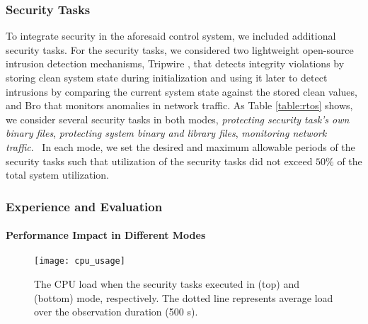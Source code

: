\documentclass[../rt_server_main.tex]{subfiles}
\begin{document}

%

\subsubsection{Security Tasks}
\label{subsubsec:sec_task}

To integrate security in the aforesaid control system, we included additional security tasks. For the security tasks, we considered two lightweight open-source intrusion detection mechanisms, \ci Tripwire \cite{tripwire}, that detects integrity violations by storing clean system state during initialization and using it later to detect intrusions by comparing the current system state against the stored clean values,  and \cii Bro \cite{bro} that monitors anomalies in network traffic. As Table \ref{table:rtos} shows, %
we consider several security tasks in both modes, \eg  \textit{protecting security task's own binary files}, \textit{protecting system binary and library files}, \textit{monitoring network traffic}.~%
In each mode, we set the desired and maximum allowable periods of the security tasks such that utilization of the security tasks did not exceed $50\%$ of the total system utilization. %




\subsubsection{Experience and Evaluation}



\paragraph{Performance Impact in Different Modes}



 \begin{figure}[!t]
\centering
\texttt{[image: cpu\_usage]}
\caption{The CPU load when the security tasks executed in \pve (top) and \ave (bottom) mode, respectively. The dotted line represents average load over the observation duration (500 s).}
\label{fig:cpu_usage}
\vspace{-1.0\baselineskip}
 \end{figure}
\end{document}
